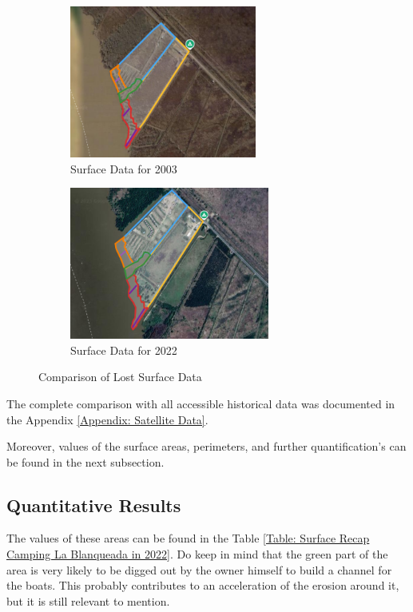 \begin{figure}[H]
    \centering
    \begin{subfigure}[b]{0.45\textwidth} %
        \includegraphics[width=\linewidth, height=5cm]{figures/appendix-g/delen2003.png}
        \caption{Surface Data for 2003}
        \label{fig:surface2003}
    \end{subfigure}
    \hfill
    \begin{subfigure}[b]{0.45\textwidth} %
        \includegraphics[width=\linewidth, height=5cm]{figures/appendix-g/delen2022.png}
        \caption{Surface Data for 2022}
        \label{fig:surface2022}
    \end{subfigure}
    \caption{Comparison of Lost Surface Data}
    \label{fig:surfacelost_comparison}
\end{figure}


The complete comparison with all accessible historical data was documented in the Appendix \ref{Appendix: Satellite Data}.

Moreover, values of the surface areas, perimeters, and further quantification's can be found in the next subsection.

\subsection{Quantitative Results}

The values of these areas can be found in the Table \ref{Table: Surface Recap Camping La Blanqueada in 2022}.
Do keep in mind that the green part of the area is very likely to be digged out by the owner himself to build a channel for the boats. This probably contributes to an acceleration of the erosion around it, but it is still relevant to mention.

